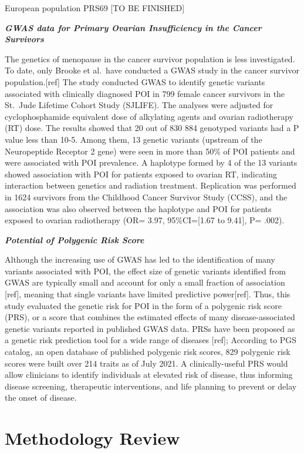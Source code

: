 \documentclass[
]{book}
\begin{document}
European population PRS69 {[}TO BE FINISHED{]}

\textbf{\emph{GWAS data for Primary Ovarian Insufficiency in the Cancer Survivors}}

The genetics of menopause in the cancer survivor population is less investigated. To date, only Brooke et al.~have conducted a GWAS study in the cancer survivor population.{[}ref{]} The study conducted GWAS to identify genetic variants associated with clinically diagnosed POI in 799 female cancer survivors in the St.~Jude Lifetime Cohort Study (SJLIFE). The analyses were adjusted for cyclophosphamide equivalent dose of alkylating agents and ovarian radiotherapy (RT) dose. The results showed that 20 out of 830 884 genotyped variants had a P value less than 10-5. Among them, 13 genetic variants (upstream of the Neuropeptide Receptor 2 gene) were seen in more than 50\% of POI patients and were associated with POI prevalence. A haplotype formed by 4 of the 13 variants showed association with POI for patients exposed to ovarian RT, indicating interaction between genetics and radiation treatment. Replication was performed in 1624 survivors from the Childhood Cancer Survivor Study (CCSS), and the association was also observed between the haplotype and POI for patients exposed to ovarian radiotherapy (OR= 3.97, 95\%CI={[}1.67 to 9.41{]}, P= .002).

\textbf{\emph{Potential of Polygenic Risk Score}}

Although the increasing use of GWAS has led to the identification of many variants associated with POI, the effect size of genetic variants identified from GWAS are typically small and account for only a small fraction of association {[}ref{]}, meaning that single variants have limited predictive power{[}ref{]}. Thus, this study evaluated the genetic risk for POI in the form of a polygenic risk score (PRS), or a score that combines the estimated effects of many disease-associated genetic variants reported in published GWAS data. PRSs have been proposed as a genetic risk prediction tool for a wide range of diseases {[}ref{]}; According to PGS catalog, an open database of published polygenic risk scores, 829 polygenic risk scores were built over 214 traits as of July 2021. A clinically-useful PRS would allow clinicians to identify individuals at elevated risk of disease, thus informing disease screening, therapeutic interventions, and life planning to prevent or delay the onset of disease.

\hypertarget{methodology-review}{%
\section{Methodology Review}\label{methodology-review}}
\end{document}
